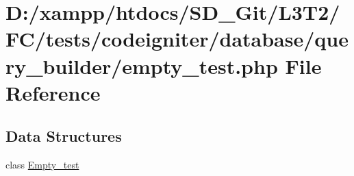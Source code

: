 \hypertarget{tests_2codeigniter_2database_2query__builder_2empty__test_8php}{}\section{D\+:/xampp/htdocs/\+S\+D\+\_\+\+Git/\+L3\+T2/\+F\+C/tests/codeigniter/database/query\+\_\+builder/empty\+\_\+test.php File Reference}
\label{tests_2codeigniter_2database_2query__builder_2empty__test_8php}
\subsection*{Data Structures}
\begin{DoxyCompactItemize}
\item 
class \hyperlink{class_empty__test}{Empty\+\_\+test}
\end{DoxyCompactItemize}
